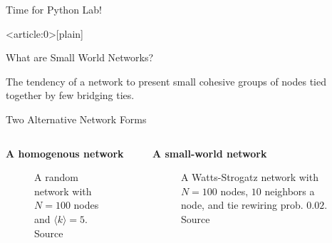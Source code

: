 \documentclass[aspectratio=1610]{beamer}
\begin{document}
\begin{frame}{}{}
	\centering
	\Large
	Time for Python Lab!
\end{frame}

{ %
    \begin{frame}<article:0>[plain]
     \end{frame}
}

\begin{frame}{What are Small World Networks?}
	\begin{tcolorbox}[
		colback=tri_2!5!white,
		colframe=tri_2!90!black,
		title={\centering \Large $\sim$ Definition 2 --- Small-world network $\sim$}]
		\large The tendency of a network to present small cohesive 
		groups of nodes tied together by few bridging ties.
	\end{tcolorbox}
\end{frame}

\begin{frame}{Two Alternative Network Forms}
	\begin{columns}[t]
		\begin{column}{0.5\textwidth}
			\begin{center}
				\textbf{A homogenous network}
				\begin{figure}
					
				\caption*{
					\footnotesize
					A random network with $N=100$ nodes 
					and $\langle k \rangle = 5$. Source 
					\cite{steger1999}
					}
				\end{figure}
			\end{center}
		\end{column}
		\begin{column}{0.5\textwidth}
			\begin{center}
				\textbf{A small-world network}
				\begin{figure}
					
				\caption*{
					\footnotesize
					A Watts-Strogatz network with $N=100$
					nodes, $10$ neighbors a node, and 
					tie rewiring prob. $0.02$. Source
					\cite{watts1998}
					}
				\end{figure}
			\end{center}
		\end{column}
	\end{columns}
\end{frame}
\end{document}
